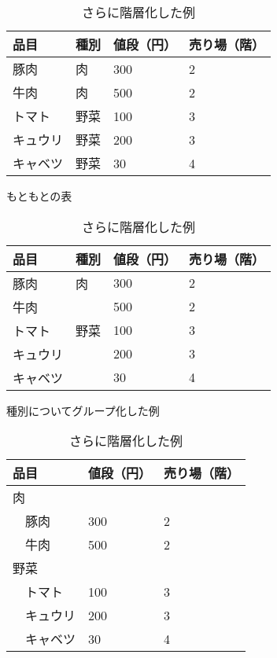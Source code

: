 \documentclass[uplatex,onecolumn,9pt,dvipdfmx]{jsarticle}
\begin{document}
\begin{table}[h]
    \begin{minipage}[t]{0.32\linewidth}
        \centering
        \begin{tabular}{@{}llll@{}} \toprule
            品目 & 種別 & 値段（円）& 売り場（階） \\ \midrule
            豚肉  & 肉 & 300 & 2  \\ 
            牛肉  & 肉 & 500 & 2  \\ 
            トマト  & 野菜 & 100 & 3 \\ 
            キュウリ  & 野菜 & 200 & 3 \\ 
            キャベツ  & 野菜 & 30 & 4 \\ \bottomrule   
        \end{tabular}
        \caption{もともとの表}
        \label{tbl:row_hierarchy1}
    \end{minipage}
    \hfill
    \begin{minipage}[t]{0.32\linewidth}
        \centering
        \begin{tabular}{@{}llll@{}} \toprule
            品目 & 種別 & 値段（円）& 売り場（階） \\ \midrule
            豚肉  & 肉 & 300 & 2  \\ 
            牛肉  &  & 500 & 2  \\ 
            トマト  & 野菜 & 100 & 3 \\ 
            キュウリ  &  & 200 & 3 \\ 
            キャベツ  & & 30 & 4 \\ \bottomrule   
        \end{tabular}
        \caption{種別についてグループ化した例}
        \label{tbl:row_hierarchy2}
    \end{minipage}
    \hfill
    \begin{minipage}[t]{0.32\linewidth}
        \centering
        \begin{tabular}{@{}lll@{}} \toprule
            品目  & 値段（円）& 売り場（階） \\ \midrule
            肉       & & \\
            ~~豚肉     & 300 & 2  \\ 
            ~~牛肉     & 500 & 2  \\ 
            野菜     & & \\
            ~~トマト   & 100 & 3 \\ 
            ~~キュウリ & 200 & 3 \\ 
            ~~キャベツ & 30 & 4 \\ \bottomrule   
        \end{tabular}
        \caption{さらに階層化した例}
        \label{tbl:row_hierarchy3}
    \end{minipage}
\end{table}
\end{document}
